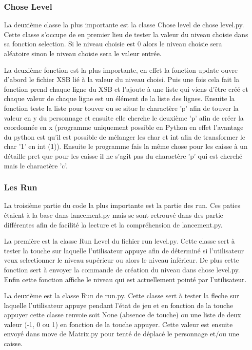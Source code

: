 \documentclass[a4paper,12pt]{article} %
\begin{document}
\subsubsection{Chose Level}

La deuxième classe la plus importante est la classe Chose level de chose level.py.
Cette classe s'occupe de en premier lieu de tester la valeur du niveau choisie dans sa fonction selection.
Si le niveau choisie est 0 alors le niveau choisie sera aléatoire sinon le niveau choisie sera le valeur entrée.

La deuxième fonction est la plus importante, en effet la fonction update ouvre d'abord le fichier XSB lié à la valeur du niveau choisi.
Puis une fois cela fait la fonction prend chaque ligne du XSB et l'ajoute à une liste qui viens d'être créé et chaque valeur de chaque ligne est un élément de la liste des lignes.
Ensuite la fonction teste la liste pour touver ou se situe le charactère 'p' afin de touver la valeur en y du personnage et ensuite elle cherche le deuxième 'p' afin de créer la coordonnée en x (programme uniquement possible en Python en effet l'avantage du python est qu'il est possible de mélanger les char et int afin de transformer le char '1' en int (1)).
Ensuite le programme fais la même chose pour les caisse à un détaille pret que pour les caisse il ne s'agit pas du charactère 'p' qui est cherché mais le charactère 'c'. 

\subsubsection{Les Run}

La troisième partie du code la plus importante est la partie des run.
Ces paties étaient à la base dans lancement.py mais se sont retrouvé dans des partie différentes afin de facilité la lecture et la compréhension de lancement.py.

La première est la classe Run Level du fichier run level.py.
Cette classe sert à tester la touche sur laquelle l'utilisateur appuye afin de déterminé si l'utilisateur veux selectionner le niveau supérieur ou alors le niveau inférieur.
De plus cette fonction sert à envoyer la commande de création du niveau dans chose level.py.
Enfin cette fonction affiche le niveau qui est actuellement pointé par l'utilisateur.

La deuxième est la classe Run de run.py.
Cette classe sert à tester la fleche sur laquelle l'utilisateur appuye pendant l'état de jeu et en fonction de la touche appuyer cette classe renvoie soit None (absence de touche) ou une liste de deux valeur (-1, 0 ou 1) en fonction de la touche appuyer.
Cette valeur est ensuite envoyé dans move de Matrix.py pour tenté de déplacé le personnage et/ou une caisse.
\end{document}

